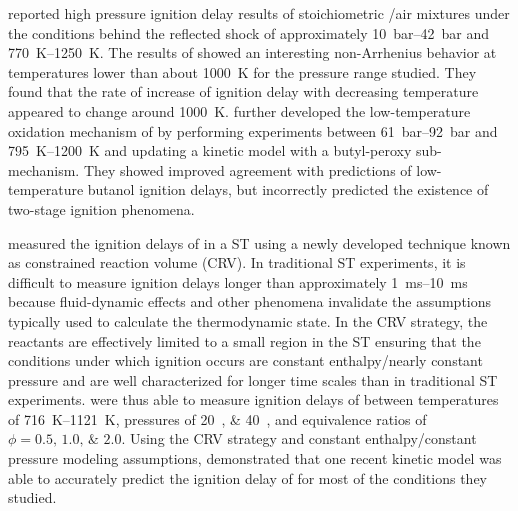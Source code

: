 \documentclass[../main.tex]{subfiles}
\begin{document}
\textcite{Heufer2011} reported high pressure ignition delay
results of stoichiometric \nBuOH{}/air mixtures under the
conditions behind the reflected shock of approximately \SIrange{10}{42}{\bar}
and \SIrange{770}{1250}{\kelvin}. The results of \textcite{Heufer2011}
showed an interesting non-Arrhenius behavior at
temperatures lower than about \SI{1000}{\kelvin} for the pressure range
studied. They found that the rate of increase of ignition delay with
decreasing temperature appeared to change around \SI{1000}{\kelvin}.
\textcite{Vranckx2011} further developed the low-temperature oxidation
mechanism of \nBuOH{} by performing experiments between
\SIrange{61}{92}{\bar} and \SIrange{795}{1200}{\kelvin} and updating
a kinetic model with a butyl-peroxy sub-mechanism. They showed improved
agreement with predictions of low-temperature butanol ignition delays,
but incorrectly predicted the existence of two-stage ignition phenomena.

\textcite{Zhu2014} measured the ignition delays of \nBuOH{}
in a ST using a newly developed technique known as constrained
reaction volume (CRV). In traditional ST experiments,
it is difficult to measure ignition delays longer than approximately
\SIrange{1}{10}{\milli\second} because fluid-dynamic effects and other
phenomena invalidate the assumptions typically used to calculate the
thermodynamic state. In the CRV strategy, the reactants are effectively
limited to a small region in the ST ensuring that the conditions
under which ignition occurs are constant enthalpy/nearly constant pressure
and are well characterized for longer time
scales than in traditional ST experiments. \textcite{Zhu2014}
were thus able to measure ignition delays of \nBuOH{} between
temperatures of \SIrange{716}{1121}{\kelvin}, pressures of
\SIlist{20;40}{\atmosphere}, and equivalence ratios of
$\phi = \numlist{0.5;1.0;2.0}$. Using the CRV strategy and constant
enthalpy/constant pressure modeling assumptions, \textcite{Zhu2014}
demonstrated that one recent kinetic model was able to accurately predict the
ignition delay of \nBuOH{} for most of the conditions
they studied.
\end{document}

